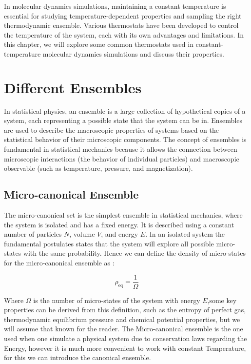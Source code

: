 \documentclass[ansiapaper]{report}
\begin{document}
\begin{multicols}{3}
    In molecular dynamics simulations, maintaining a constant temperature is essential for studying temperature-dependent properties and sampling the right thermodynamic ensemble. Various thermostats have been developed to control the temperature of the system, each with its own advantages and limitations. In this chapter, we will explore some common thermostats used in constant-temperature molecular dynamics simulations and discuss their properties.

    \section{Different Ensembles}

	In statistical physics, an ensemble is a large collection of hypothetical copies of a system, each representing a possible state that the system can be in. Ensembles are used to describe the macroscopic properties of systems based on the statistical behavior of their microscopic components. The concept of ensembles is fundamental in statistical mechanics because it allows the connection between microscopic interactions (the behavior of individual particles) and macroscopic observable (such as temperature, pressure, and magnetization).

    \subsection{Micro-canonical Ensemble}
    The micro-canonical set is the simplest ensemble in statistical mechanics, where the system is isolated and has a fixed energy. It is described using a constant number of particles $N$, volume $V$, and energy $E$. In an isolated system the fundamental postulates states that the system will explore all possible micro-states with the same probability. Hence we can define the density of micro-states for the micro-canonical ensemble as :

 $$ \rho_{\text{eq}} = \frac{1}{\Omega} $$

Where $ \Omega $ is the number of micro-states of the system with energy $E$,some key properties can be derived from this definition, such as the entropy of perfect gas, thermodynamic equilibrium pressure and chemical potential properties, but we will assume that known for the reader. The Micro-canonical ensemble is the one used when one simulate a physical system due to conservation laws regarding the Energy, however it is much more convenient to work with constant Temperature, for this we can introduce the canonical ensemble. 


\end{multicols}
\end{document}
